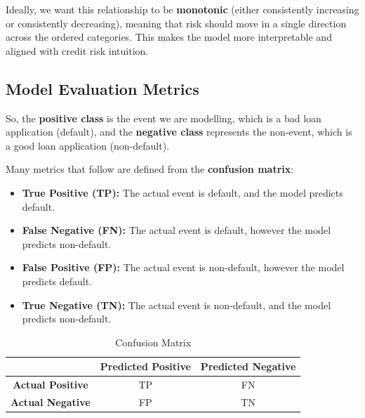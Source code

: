 \documentclass[
  letterpaper,
  DIV=11,
  numbers=noendperiod]{scrartcl}
\providecommand{\tightlist}{%
  \setlength{\itemsep}{0pt}\setlength{\parskip}{0pt}}
\begin{document}
Ideally, we want this relationship to be \textbf{monotonic} (either
consistently increasing or consistently decreasing), meaning that risk
should move in a single direction across the ordered categories. This
makes the model more interpretable and aligned with credit risk
intuition.

\subsection{Model Evaluation Metrics}

So, the \textbf{positive class} is the event we are modelling, which is
a bad loan application (default), and the \textbf{negative class}
represents the non-event, which is a good loan application
(non-default).

Many metrics that follow are defined from the \textbf{confusion matrix}:

\begin{itemize}
\tightlist
\item
  \textbf{True Positive (TP):} The actual event is default, and the
  model predicts default.
\item
  \textbf{False Negative (FN):} The actual event is default, however the
  model predicts non-default.
\item
  \textbf{False Positive (FP):} The actual event is non-default, however
  the model predicts default.
\item
  \textbf{True Negative (TN):} The actual event is non-default, and the
  model predicts non-default.
\end{itemize}

\begin{table}[h]
\centering
\begin{tabular}{c|cc}
\hline
 & \textbf{Predicted Positive} & \textbf{Predicted Negative} \\
\hline
\textbf{Actual Positive} & TP & FN \\
\textbf{Actual Negative} & FP & TN \\
\hline
\end{tabular}
\caption{Confusion Matrix}
\end{table}
\end{document}

